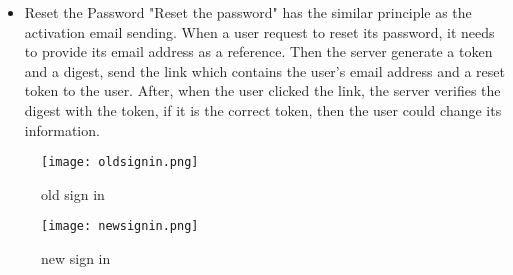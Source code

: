 \begin{enumerate}
\begin{itemize}
\item{Reset the Password}
"Reset the password" has the similar principle as the activation email sending. When a user request to reset its password, it needs to provide its email address as a reference. Then the server generate a token and a digest, send the link which contains the user's email address and a reset token to the user. After, when the user clicked the link, the server verifies the digest with the token, if it is the correct token, then the user could change its information.
\end{itemize}
\begin{figure}[h!]
\centering
\texttt{[image: oldsignin.png]}
\caption{old sign in }
\label{fig-sample}
\end{figure}

\begin{figure}[h!]
\centering
\texttt{[image: newsignin.png]}
\caption{new sign in }
\label{fig-sample}
\end{figure}

\end{enumerate}



